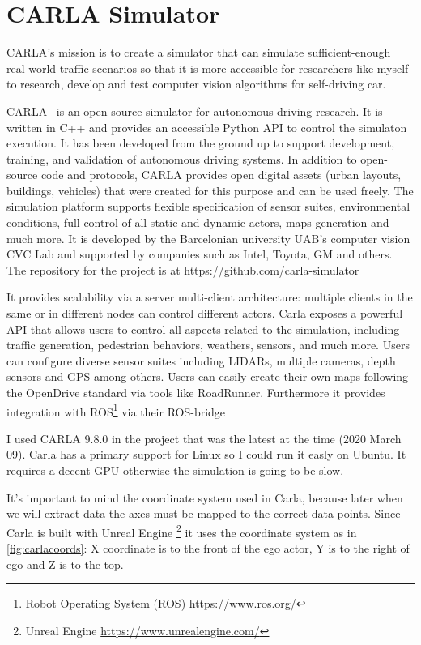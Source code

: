 \chapter{CARLA Simulator}
\label{chap:carlasim}

CARLA's mission is to create a simulator that can simulate sufficient-enough
real-world traffic scenarios so that it is more accessible for researchers like
myself to research, develop and test computer vision algorithms for
self-driving car. 

CARLA~\cite{Dosovitskiy17} is an open-source simulator for autonomous driving
research. It is written in C++ and provides an accessible Python API to
control the simulaton execution. It has been developed from the ground
up to support development, training, and validation of autonomous driving
systems. In addition to open-source code and protocols, CARLA provides open
digital assets (urban layouts, buildings, vehicles) that were created for this
purpose and can be used freely. The simulation platform supports flexible
specification of sensor suites, environmental conditions, full control of all
static and dynamic actors, maps generation and much more. It is developed by the
Barcelonian university UAB's computer vision CVC Lab and supported by companies
such as Intel, Toyota, GM and others. The repository for the project is at
\url{https://github.com/carla-simulator}

It provides scalability via a server multi-client architecture: multiple clients
in the same or in different nodes can control different actors. Carla exposes a
powerful API that allows users to control all aspects related to the simulation,
including traffic generation, pedestrian behaviors, weathers, sensors, and much
more. Users can configure diverse sensor suites including LIDARs, multiple
cameras, depth sensors and GPS among others. Users can easily create their own
maps following the OpenDrive standard via tools like RoadRunner. Furthermore it
provides integration with ROS\footnote{Robot Operating System (ROS)
\url{https://www.ros.org/}} via their ROS-bridge

I used CARLA 9.8.0 in the project that was the latest at the time (2020 March
09). Carla has a primary support for Linux so I could run it easly on Ubuntu. It
requires a decent GPU otherwise the simulation is going to be slow.

It's important to mind the coordinate system used in Carla, because later when
we will extract data the axes must be mapped to the correct data points. Since
Carla is built with Unreal Engine \footnote{Unreal Engine
\url{https://www.unrealengine.com/}} it uses the coordinate system as in
\autoref{fig:carlacoords}: X coordinate is to the front of the ego actor, Y is to the
right of ego and Z is to the top.

